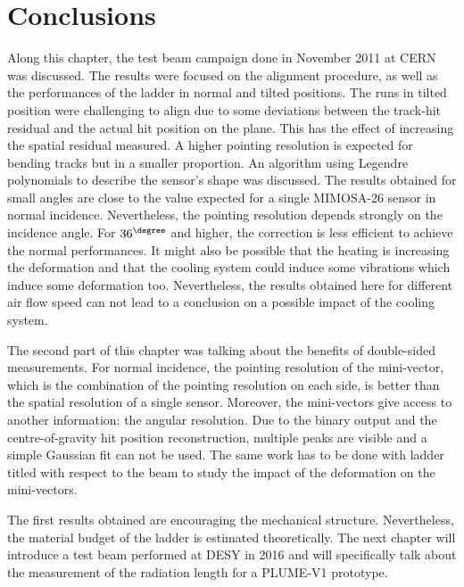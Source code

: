   \section{Conclusions}

  Along this chapter, the test beam campaign done in November 2011 at CERN was discussed. 
  The results were focused on the alignment procedure, as well as the performances of the ladder in normal and tilted positions.
  The runs in tilted position were challenging to align due to some deviations between the track-hit residual and the actual hit position on the plane.
  This has the effect of increasing the spatial residual measured.
  A higher pointing resolution is expected for bending tracks but in a smaller proportion.
  An algorithm using Legendre polynomials to describe the sensor's shape was discussed.
  The results obtained for small angles are close to the value expected for a single MIMOSA-26 sensor in normal incidence. 
  Nevertheless, the pointing resolution depends strongly on the incidence angle.
  For $36^{\degree}$ and higher, the correction is less efficient to achieve the normal performances.
  It might also be possible that the heating is increasing the deformation and that the cooling system could induce some vibrations which induce some deformation too.
  Nevertheless, the results obtained here for different air flow speed can not lead to a conclusion on a possible impact of the cooling system.

  The second part of this chapter was talking about the benefits of double-sided measurements.
  For normal incidence, the pointing resolution of the mini-vector, which is the combination of the pointing resolution on each side,  is better than the spatial resolution of a single sensor.
  Moreover, the mini-vectors give access to another information: the angular resolution.
  Due to the binary output and the centre-of-gravity hit position reconstruction, multiple peaks are visible and a simple Gaussian fit can not be used. 
  The same work has to be done with ladder titled with respect to the beam to study the impact of the deformation on the mini-vectors.

  The first results obtained are encouraging the mechanical structure.
  Nevertheless, the material budget of the ladder is estimated theoretically.
  The next chapter will introduce a test beam performed at DESY in 2016 and will specifically talk about the measurement of the radiation length for a PLUME-V1 prototype.


